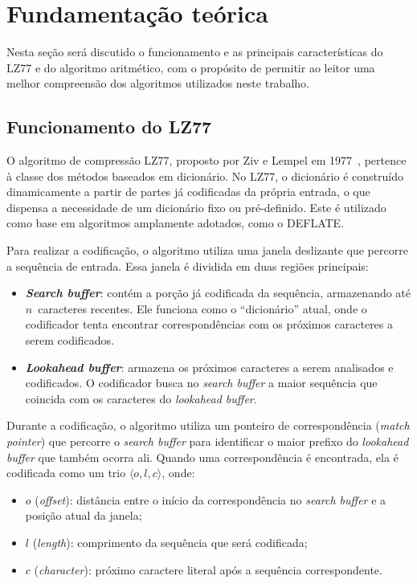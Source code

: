 \chapter{Fundamentação teórica}\label{cap:revisao}

Nesta seção será discutido o funcionamento e as principais características do LZ77 e do algoritmo aritmético, com o propósito de permitir ao leitor uma melhor compreensão dos algoritmos utilizados neste trabalho.

\section{Funcionamento do LZ77}\label{sec:LZ77}

O algoritmo de compressão LZ77, proposto por Ziv e Lempel em 1977~\cite{1055714}, pertence à classe dos métodos baseados em dicionário. No LZ77, o dicionário é construído dinamicamente a partir de partes já codificadas da própria entrada, o que dispensa a necessidade de um dicionário fixo ou pré-definido. Este é utilizado como base em algoritmos amplamente adotados, como o DEFLATE.

Para realizar a codificação, o algoritmo utiliza uma janela deslizante que percorre a sequência de entrada. Essa janela é dividida em duas regiões principais:

\begin{itemize}
  \item \textbf{\textit{Search buffer}}: contém a porção já codificada da sequência, armazenando até $n$~caracteres recentes. Ele funciona como o “dicionário” atual, onde o codificador tenta encontrar correspondências com os próximos caracteres a serem codificados.
  \item \textbf{\textit{Lookahead buffer}}: armazena os próximos caracteres a serem analisados e codificados. O codificador busca no \textit{search buffer} a maior sequência que coincida com os caracteres do \textit{lookahead buffer}.
\end{itemize}

Durante a codificação, o algoritmo utiliza um ponteiro de correspondência (\textit{match pointer}) que percorre o \textit{search buffer} para identificar o maior prefixo do \textit{lookahead buffer} que também ocorra ali. Quando uma correspondência é encontrada, ela é codificada como um trio $\langle o, l, c \rangle$, onde:
\begin{itemize}
  \item $o$ (\textit{offset}): distância entre o início da correspondência no \textit{search buffer} e a posição atual da janela;
  \item $l$ (\textit{length}): comprimento da sequência que será codificada;
  \item $c$ (\textit{character}): próximo caractere literal após a sequência correspondente.
\end{itemize}

